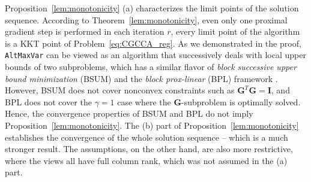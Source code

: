 \documentclass[10pt,journal]{IEEEtran}
\newcommand{\G}{\boldsymbol{G}}
\begin{document}
Proposition~\ref{lem:monotonicity} (a) characterizes the limit points of the solution sequence.
According to Theorem~\ref{lem:monotonicity}, even only one proximal gradient step is performed in each iteration $r$, every limit point of the algorithm is a KKT point of Problem~\eqref{eq:CGCCA_reg}.
As we demonstrated in the proof, 
\texttt{AltMaxVar} can be viewed as an algorithm that successively deals with local upper bounds of
two subproblems, which has a similar flavor of \emph{block successive upper bound minimization} (BSUM) \cite{razaviyayn2013unified} and the \emph{block prox-linear} (BPL) framework \cite{xu2013block,xu2014globally}.
However, BSUM does not cover nonconvex constraints such as $\G^T\G={\bm I}$,
and BPL does not cover the $\gamma=1$ case where the $\G$-subproblem is optimally solved.
Hence, the convergence properties of BSUM and BPL do not imply Proposition~\ref{lem:monotonicity}.
The (b) part of Proposition~\ref{lem:monotonicity} establishes the convergence of the whole solution sequence -- which is a much stronger result. The assumptions, on the other hand, are also more restrictive, where the views all have full column rank, which was not assumed in the (a) part.
\end{document}

